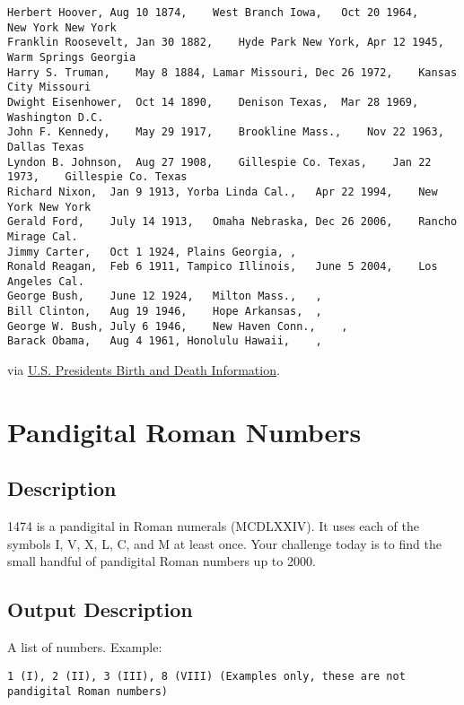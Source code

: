\begin{lstlisting}
Herbert Hoover, Aug 10 1874,    West Branch Iowa,   Oct 20 1964,    New York New York
Franklin Roosevelt, Jan 30 1882,    Hyde Park New York, Apr 12 1945,    Warm Springs Georgia
Harry S. Truman,    May 8 1884, Lamar Missouri, Dec 26 1972,    Kansas City Missouri
Dwight Eisenhower,  Oct 14 1890,    Denison Texas,  Mar 28 1969,    Washington D.C.
John F. Kennedy,    May 29 1917,    Brookline Mass.,    Nov 22 1963,    Dallas Texas
Lyndon B. Johnson,  Aug 27 1908,    Gillespie Co. Texas,    Jan 22 1973,    Gillespie Co. Texas
Richard Nixon,  Jan 9 1913, Yorba Linda Cal.,   Apr 22 1994,    New York New York
Gerald Ford,    July 14 1913,   Omaha Nebraska, Dec 26 2006,    Rancho Mirage Cal.
Jimmy Carter,   Oct 1 1924, Plains Georgia, ,   
Ronald Reagan,  Feb 6 1911, Tampico Illinois,   June 5 2004,    Los Angeles Cal.
George Bush,    June 12 1924,   Milton Mass.,   ,   
Bill Clinton,   Aug 19 1946,    Hope Arkansas,  ,   
George W. Bush, July 6 1946,    New Haven Conn.,    ,   
Barack Obama,   Aug 4 1961, Honolulu Hawaii,    ,
\end{lstlisting}

via \href{http://www.presidentsusa.net/birth.html}{U.S. Presidents Birth
and Death Information}.


\section{Pandigital Roman Numbers}

\subsection*{Description}\label{description-33}

1474 is a pandigital in Roman numerals (MCDLXXIV). It uses each of the
symbols I, V, X, L, C, and M at least once. Your challenge today is to
find the small handful of pandigital Roman numbers up to 2000.

\subsection*{Output Description}\label{output-description-25}

A list of numbers. Example:

\begin{lstlisting}
1 (I), 2 (II), 3 (III), 8 (VIII) (Examples only, these are not pandigital Roman numbers)
\end{lstlisting}

